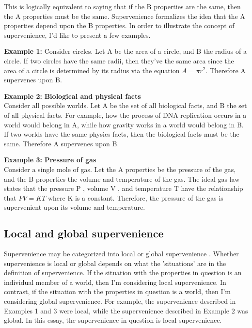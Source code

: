 \documentclass{article}
\begin{document}
This is logically equivalent to saying that if the B properties are the same, then the A properties must be the same. Supervenience formalizes the idea that the A properties depend upon the B properties. In order to illustrate the concept of supervenience, I'd like to present a few examples.
 
\textbf{Example  1:}\label{Ex-1} Consider circles.  Let A be the area of a circle, and B the radius of a circle. If two circles have the same radii, then they've the same area since the area of a circle is determined by its radius via the equation $A = \pi r^2$. Therefore A supervenes upon B.


\textbf{Example 2:}\label{Ex-2} \textbf{Biological and physical facts} \\  Consider all possible worlds.  Let A be the set of all biological facts, and B the set of all physical facts. For example, how the process of DNA replication occurs in a world would belong in A, while how gravity works in a world would belong in
B. If two worlds have the same physics facts, then the biological facts must be the same. Therefore
A supervenes upon B. \cite{chalmers1996conscious}


\textbf{Example 3:}\label{Ex-3} \textbf{Pressure of gas} \\  Consider a single mole of gas. Let the A properties be the pressure of the gas, and the B properties the volume and temperature of the gas. The ideal gas law states that the pressure P , volume V , and temperature T have the relationship that $PV = KT$ where K is a constant. Therefore, the pressure of the gas is supervenient upon its volume and temperature. 
\cite{chalmers1996conscious}

\subsection*{Local and global supervenience}

Supervenience may be categorized into local or global supervenience \cite{chalmers1996conscious}.  Whether supervenience is local or global depends on what the ’situations’ are in the definition of supervenience. If the situation with the properties in question is an individual member of a world, then I'm considering local supervenience.   In contrast, if the situation with the properties in question is a world, then I'm considering global supervenience. For example, the supervenience described in Examples 1 and 3 were local, while the supervenience described in Example 2 was global. In this essay, the supervenience in question is local supervenience.
\end{document}
